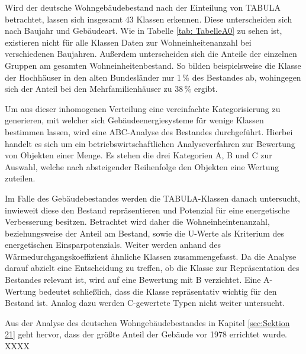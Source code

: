 Wird der deutsche Wohngebäudebestand nach der Einteilung von TABULA betrachtet, lassen sich insgesamt 43 Klassen erkennen.
Diese unterscheiden sich nach Baujahr und Gebäudeart.
Wie in Tabelle \ref{tab: TabelleA0} zu sehen ist, existieren nicht für alle Klassen Daten zur Wohneinheitenanzahl bei verschiedenen Baujahren.
Außerdem unterscheiden sich die Anteile der einzelnen Gruppen am gesamten Wohneinheitenbestand.
So bilden beispielsweise die Klasse der Hochhäuser in den alten Bundesländer nur 1\,\% des Bestandes ab, wohingegen sich der Anteil bei den Mehrfamilienhäuser zu 38\,\% ergibt.

Um aus dieser inhomogenen Verteilung eine vereinfachte Kategorisierung zu generieren, mit welcher sich Gebäudeenergiesysteme für wenige Klassen bestimmen lassen, wird eine ABC-Analyse des Bestandes durchgeführt.
Hierbei handelt es sich um ein betriebswirtschaftlichen Analyseverfahren zur Bewertung von Objekten einer Menge.
Es stehen die drei Kategorien A, B und C zur Auswahl, welche nach absteigender Reihenfolge den Objekten eine Wertung zuteilen.

Im Falle des Gebäudebestandes werden die TABULA-Klassen danach untersucht, inwieweit diese den Bestand repräsentieren und Potenzial für eine energetische Verbesserung besitzen.
Betrachtet wird daher die Wohneinheintenanzahl, beziehungsweise der Anteil am Bestand, sowie die U-Werte als Kriterium des energetischen Einsparpotenzials.
Weiter werden anhand des Wärmedurchgangskoeffizient ähnliche Klassen zusammengefasst.
Da die Analyse darauf abzielt eine Entscheidung zu treffen, ob die Klasse zur Repräsentation des Bestandes relevant ist, wird auf eine Bewertung mit B verzichtet.
Eine A-Wertung bedeutet schließlich, dass die Klasse repräsentativ wichtig für den Bestand ist.
Analog dazu werden C-gewertete Typen nicht weiter untersucht.

Aus der Analyse des deutschen Wohngebäudebestandes in Kapitel \ref{sec:Sektion 21} geht hervor, dass der größte Anteil der Gebäude vor 1978 errichtet wurde.
XXXX


